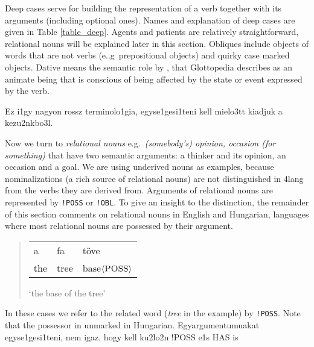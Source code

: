 \documentclass[a4paper,10pt]{article}
\begin{document}
Deep cases serve for building the representation of a verb together with its
arguments (including optional ones). Names and explanation of deep cases are
given in Table \ref{table_deep}.  Agents and patients are relatively
straightforward, relational nouns will be explained later in this
section. Obliques include objects of words that are not verbs
(e..g\ prepositional objects) and quirky case marked objects. {{Dative means
    the semantic role by \cite{Fillmore:1968}, that Glottopedia describes as
    an animate being that is conscious of being affected by the state or event
    expressed by the verb.}}

% 
 {\color{red} Ez i1gy nagyon rossz terminolo1gia, 
egyse1gesi1teni kell mielo3tt kiadjuk a kezu2nkbo3l.} 

Now we turn to \emph{relational nouns} e.g.\ \emph{(somebody's) opinion,
  occasion (for something)} that have two semantic arguments: a thinker and
its opinion, an occasion and a goal. We are using underived nouns as examples,
because nominalizations (a rich source of relational nouns) are not
distinguished in 4lang from the verbs they are derived from.  Arguments of
relational nouns are represented by \texttt{!POSS} or \texttt{!OBL}. To give
an insight to the distinction, the remainder of this section comments on
relational nouns in English and Hungarian, languages where most {relational
  nouns} are possessed by their argument.
\begin{quote}
 \begin{tabular}{lll}
  a &fa &töve
 \\the &tree &base$\langle\textsc{POSS}\rangle$
 \end{tabular}
 
 `the base of the tree'
\end{quote}
In these cases we refer to the related word (\emph{tree} in the example) by
\texttt{!POSS}. Note that the possessor in unmarked in Hungarian. {\color{red}
  Egyargumentumuakat egyse1gesi1teni, nem igaz, hogy kell ku2lo2n !POSS e1s
  HAS is}
 
\end{document}
